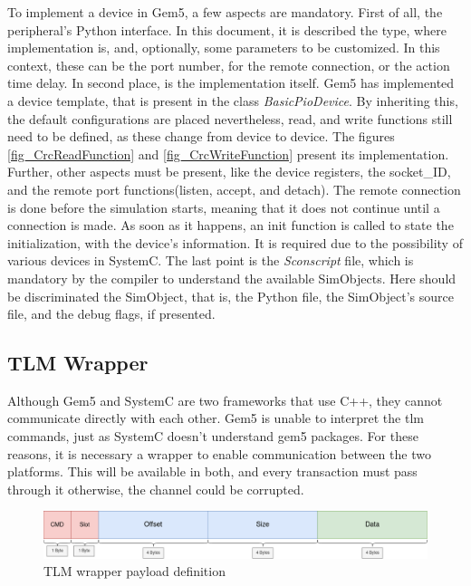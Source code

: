 To implement a device in Gem5, a few aspects are mandatory. First of all, the peripheral's Python interface. In this document, it is 
described the type, where implementation is, and, optionally, some parameters to be customized. In this context, these can be
the port number, for the remote connection, or the action time delay. In second place, is the implementation itself. Gem5 has implemented 
a device template, that is present in the class \textit{BasicPioDevice}. By inheriting this, the default configurations are placed 
nevertheless, read, and write functions still need to be defined, as these change from device to device. The figures \ref{fig_CrcReadFunction} and \ref{fig_CrcWriteFunction}
present its implementation. Further, other aspects must be present, like the device registers, the socket\_ID, and the remote 
port functions(listen, accept, and detach). The remote connection is done before the simulation starts, meaning that it does not
continue until a connection is made. As soon as it happens, an init function is called to state the initialization, with the 
device's information. It is required due to the possibility of various devices in SystemC. The last point is the \textit{Sconscript} file, 
which is mandatory by the compiler to understand the available SimObjects. Here should be discriminated the SimObject, that is, 
the Python file, the SimObject's source file, and the debug flags, if presented.

\subsection{TLM Wrapper}
\label{subsec::TLMwrapper}

Although Gem5 and SystemC are two frameworks that use C++, they cannot communicate directly with each other. Gem5 is unable to 
interpret the \gls{tlm} commands, just as SystemC doesn't understand gem5 packages. For these reasons,
it is necessary a wrapper to enable communication between the two platforms. This will be available in both, and every transaction must
pass through it otherwise, the channel could be corrupted. 

\begin{figure}[H]
	\centering
 	\includegraphics[width=0.8\linewidth]{Images/TLM_Wrapper_Payload.png} 
 	\caption{TLM wrapper payload definition}
\end{figure}


